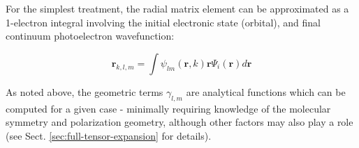 \documentclass[10pt]{article}
\begin{document}


For the simplest treatment, the radial matrix element can be approximated as a 1-electron integral involving the initial electronic state (orbital), and final continuum photoelectron wavefunction:

\begin{equation}
\mathbf{r}_{k,l,m}=\int\psi_{lm}(\bm{r},k)\bm{r}\Psi_{i}(\bm{r})d\bm{r}
\label{eq:r-kllam-integral}
\end{equation}


As noted above, the geometric terms $\gamma_{l,m}$ are analytical functions which can be computed for a given case - minimally requiring knowledge of the molecular symmetry and polarization geometry, although other factors may also play a role (see Sect. \ref{sec:full-tensor-expansion} for details). 



\end{document}
